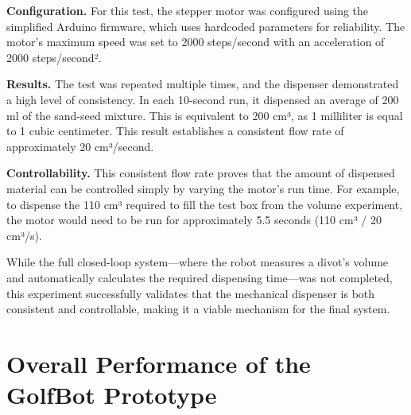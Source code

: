 \textbf{Configuration.}
For this test, the stepper motor was configured using the simplified Arduino firmware, which uses hardcoded parameters for reliability. The motor's maximum speed was set to 2000 steps/second with an acceleration of 2000 steps/second².

\textbf{Results.}
The test was repeated multiple times, and the dispenser demonstrated a high level of consistency. In each 10-second run, it dispensed an average of 200 ml of the sand-seed mixture. This is equivalent to 200 cm³, as 1 milliliter is equal to 1 cubic centimeter. This result establishes a consistent flow rate of approximately 20 cm³/second.

\textbf{Controllability.}
This consistent flow rate proves that the amount of dispensed material can be controlled simply by varying the motor's run time. For example, to dispense the 110 cm³ required to fill the test box from the volume experiment, the motor would need to be run for approximately 5.5 seconds (110 cm³ / 20 cm³/s).

While the full closed-loop system—where the robot measures a divot's volume and automatically calculates the required dispensing time—was not completed, this experiment successfully validates that the mechanical dispenser is both consistent and controllable, making it a viable mechanism for the final system.


\section{Overall Performance of the GolfBot Prototype}
